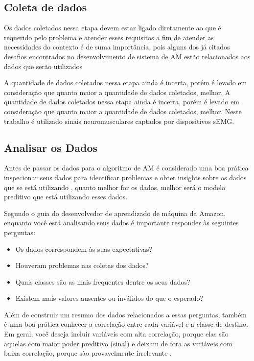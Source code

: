 \subsection{Coleta de dados}

Os dados coletados nessa etapa devem estar ligado diretamente ao que é requerido pelo problema e atender esses requisitos a fim de atender as necessidades do contexto é de suma importância, pois alguns dos já citados desafios encontrados no desenvolvimento de sistema de AM estão relacionados aos dados que serão utilizados \cite{geron2017hands}

A quantidade de dados coletados nessa etapa ainda é incerta, porém é levado em consideração que quanto maior a quantidade de dados coletados, melhor. A quantidade de dados coletados nessa etapa ainda é incerta, porém é levado em consideração que quanto maior a quantidade de dados coletados, melhor. Neste trabalho é utilizado sinais neuromusculares captados por dispositivos sEMG. 

\subsection{Analisar os Dados}

Antes de passar os dados para o algoritmo de AM é considerado uma boa prática inspecionar seus dados para identificar problemas e obter insights sobre os dados que se está utilizando \cite{Amazon}, quanto melhor for os dados, melhor será o modelo preditivo que está utilizando esses dados.

Segundo o guia do desenvolvedor de aprendizado de máquina da Amazon, enquanto você está analisando seus dados é importante responder às seguintes perguntas:
\begin{itemize}  
    \item Os dados correspondem às suas expectativas?
    \item Houveram problemas nas coletas dos dados?
    \item Quais classes são as mais frequentes dentre os seus dados?
    \item Existem mais valores ausentes ou inválidos do que o esperado?
\end{itemize}

Além de construir um resumo dos dados relacionados a essas perguntas, também é uma boa prática conhecer a correlação entre cada variável e a classe de destino. Em geral, você deseja incluir variáveis com alta correlação, porque elas são aquelas com maior poder preditivo (sinal) e deixam de fora as variáveis com baixa correlação, porque são provavelmente irrelevante \cite{Amazon}. 

